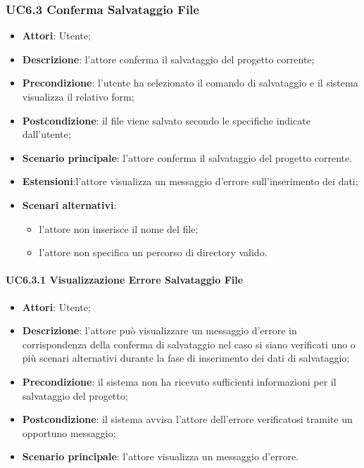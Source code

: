 \subsubsection{UC6.3 Conferma Salvataggio File}
\label{UC6.3}
\begin{itemize}
\item \textbf{Attori}: Utente;
\item \textbf{Descrizione}: l'attore conferma il salvataggio del progetto corrente;
\item \textbf{Precondizione}: l'utente ha selezionato il comando di salvataggio e il sistema visualizza il relativo form;
\item \textbf{Postcondizione}: il file viene salvato secondo le specifiche indicate dall'utente;
\item \textbf{Scenario principale}:
l'attore conferma il salvataggio del progetto corrente.
\item \textbf{Estensioni}:l'attore visualizza un messaggio d'errore sull'inserimento dei dati;
\item \textbf{Scenari alternativi}:
\begin{itemize}
\item l'attore non inserisce il nome del file;
\item l'attore non specifica un percorso di directory valido.
\end{itemize}
\end{itemize}

\paragraph{UC6.3.1 Visualizzazione Errore Salvataggio File}
\begin{itemize}
\item \textbf{Attori}: Utente;
\item \textbf{Descrizione}: l'attore può visualizzare un messaggio d'errore in corrispondenza della conferma di salvataggio nel caso si siano verificati uno o più scenari alternativi durante la fase di inserimento dei dati di salvataggio;	
\item \textbf{Precondizione}: il sistema non ha ricevuto sufficienti informazioni per il salvataggio del progetto;	
\item \textbf{Postcondizione}: il sistema avvisa l'attore dell'errore verificatosi tramite un opportuno messaggio;	
\item \textbf{Scenario principale}:
l'attore visualizza un messaggio d'errore.	
\end{itemize}

